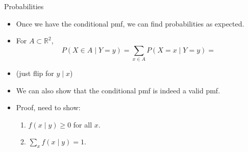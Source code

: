 \documentclass{article}
\begin{document}
Probabilities\bigskip
\begin{itemize}
    \item Once we have the conditional pmf, we can find probabilities as expected.
    \item[] For $A \subset \mathbb{R}^2$,
    \[P(X \in A \mid Y = y) = \sum_{x \in A} P(X = x \mid Y = y) = \]
    \item[] (just flip for $y \mid x$)
    \item We can also show that the conditional pmf is indeed a valid pmf.
    \item[] Proof, need to show:
    \begin{enumerate}
        \item $f(x \mid y) \ge 0$ for all $x$.
        \item $\displaystyle \sum_x f(x \mid y) = 1$.
    \end{enumerate}\vspace{170pt}
\end{itemize}\bigskip\bigskip
\end{document}
